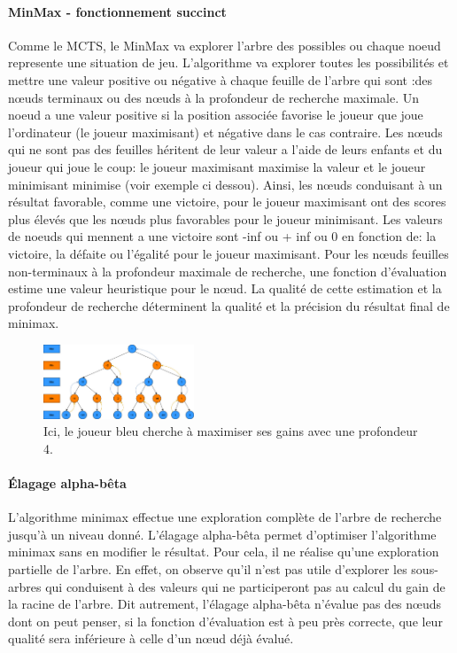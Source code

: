 \paragraph{MinMax - fonctionnement succinct}
Comme le MCTS, le MinMax va explorer l'arbre des possibles ou chaque noeud represente une situation de jeu. 
L'algorithme va explorer toutes les possibilités et mettre une valeur positive ou négative
à chaque feuille de l'arbre qui sont :des nœuds terminaux ou des nœuds à la profondeur de recherche maximale.
Un noeud a une valeur positive si la position associée favorise le joueur que joue l'ordinateur (le joueur maximisant) 
et négative dans le cas contraire.
Les nœuds qui ne sont pas des feuilles héritent de leur valeur a l'aide de leurs enfants et du joueur qui joue le coup:
le joueur maximisant maximise la valeur et le joueur minimisant minimise (voir exemple ci dessou).
Ainsi, les nœuds conduisant à un résultat favorable, comme une victoire, pour le joueur maximisant ont des scores plus
élevés que les nœuds plus favorables pour le joueur minimisant. Les valeurs de noeuds qui mennent a une victoire sont -inf ou + inf ou 0 en fonction de:
la victoire, la défaite ou l'égalité pour le joueur maximisant. Pour les nœuds feuilles non-terminaux à la profondeur maximale de recherche, 
une fonction d'évaluation estime une valeur heuristique pour le nœud. La qualité de cette estimation et la profondeur de recherche déterminent la 
qualité et la précision du résultat final de minimax.


\begin{figure}[h]
    \begin{center}
        \includegraphics[width=0.4\textwidth]{root/MinMax.jpeg}
    \end{center}
    \caption{Ici, le joueur bleu cherche à maximiser ses gains avec une profondeur 4.}\label{fig:min_max}
\end{figure}


\paragraph{Élagage alpha-bêta}
L'algorithme minimax effectue une exploration complète de l'arbre de recherche jusqu'à un niveau donné. L'élagage alpha-bêta permet d'optimiser 
l'algorithme minimax sans en modifier le résultat. Pour cela, il ne réalise qu'une exploration
partielle de l'arbre. En effet, on observe qu'il n'est pas utile d'explorer les sous-arbres qui conduisent à des valeurs
qui ne participeront pas au calcul du gain de la racine de l'arbre. Dit autrement, l'élagage alpha-bêta n'évalue pas des nœuds dont on peut penser, 
si la fonction d'évaluation est à peu près correcte, que leur qualité sera inférieure à celle d'un nœud déjà évalué.

